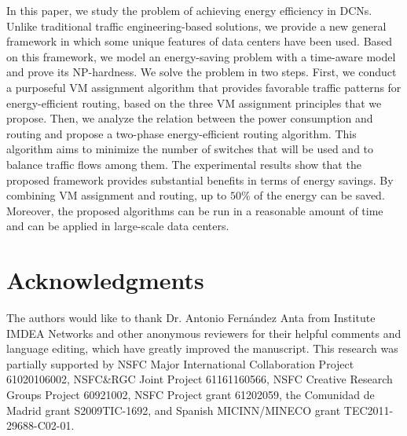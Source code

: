 \documentclass[journal,single-space,two column,twoside,10pt]{IEEEtran}
\begin{document}
In this paper, we study the problem of achieving energy efficiency in DCNs. Unlike traditional traffic engineering-based solutions, we provide a new general framework in which some unique features of data centers have been used. Based on this framework, we model an energy-saving problem with a time-aware model and prove its NP-hardness. We solve the problem in two steps. First, we conduct a purposeful VM assignment algorithm that provides favorable traffic patterns for energy-efficient routing, based on the three VM assignment principles that we propose. Then, we analyze the relation between the power consumption and routing and propose a two-phase energy-efficient routing algorithm. This algorithm aims to minimize the number of switches that will be used and to balance traffic flows among them. The experimental results show that the proposed framework provides substantial benefits in terms of energy savings. By combining VM assignment and routing, up to $50\%$ of the energy can be saved. Moreover, the proposed algorithms can be run in a reasonable amount of time and can be applied in large-scale data centers.


\section*{Acknowledgments}
The authors would like to thank Dr. Antonio Fern\'andez Anta from Institute IMDEA Networks and other anonymous reviewers for their helpful comments and language editing, which have greatly improved the manuscript. This research was partially supported by NSFC Major International Collaboration Project 61020106002, NSFC\&RGC Joint Project 61161160566, NSFC Creative Research Groups Project 60921002, NSFC Project grant 61202059, the Comunidad de Madrid grant S2009TIC-1692, and Spanish MICINN/MINECO grant TEC2011-29688-C02-01. 
\end{document}
